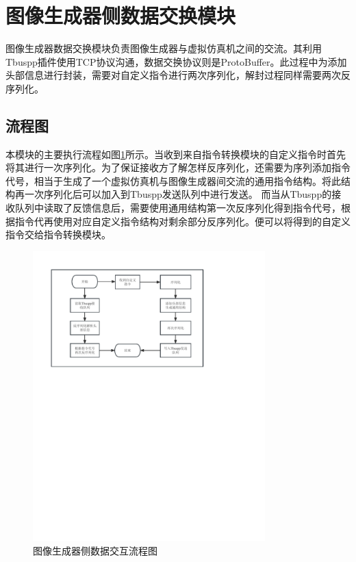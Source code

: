 \section{图像生成器侧数据交换模块}
图像生成器数据交换模块负责图像生成器与虚拟仿真机之间的交流。其利用Tbuspp插件使用TCP协议沟通，数据交换协议则是ProtoBuffer。此过程中为添加头部信息进行封装，需要对自定义指令进行两次序列化，解封过程同样需要两次反序列化。
\subsection{流程图}
 本模块的主要执行流程如图\ref{module31}所示。当收到来自指令转换模块的自定义指令时首先将其进行一次序列化。为了保证接收方了解怎样反序列化，还需要为序列添加指令代号，相当于生成了一个虚拟仿真机与图像生成器间交流的通用指令结构。将此结构再一次序列化后可以加入到Tbuspp发送队列中进行发送。
 而当从Tbuspp的接收队列中读取了反馈信息后，需要使用通用结构第一次反序列化得到指令代号，根据指令代再使用对应自定义指令结构对剩余部分反序列化。便可以将得到的自定义指令交给指令转换模块。
\begin{figure}[h!]
    \begin{center}
        \includegraphics[width=0.8\textwidth]{pictures/flowchart3.pdf}
        \caption{图像生成器侧数据交互流程图}
        \label{module31}
    \end{center}
\end{figure}
